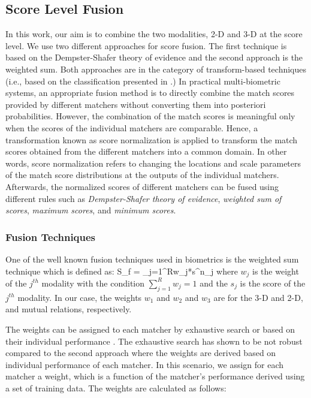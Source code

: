 \subsection{Score Level Fusion}
In this work, our aim is to combine the two modalities, 2-D and 3-D
at the score level. We use two different approaches for score
fusion. The first technique is based on the Dempster-Shafer theory
of evidence and the second approach is the weighted sum. Both
approaches are in the category of transform-based techniques (i.e.,
based on the classification presented in \cite{Ross06}.) In
practical multi-biometric systems, an appropriate fusion method is
to directly combine the match scores provided by different matchers
without converting them into posteriori probabilities. However, the
combination of the match scores is meaningful only when the scores
of the individual matchers are comparable. Hence, a transformation
known as score normalization is applied to transform the match
scores obtained from the different matchers into a common domain. In
other words, score normalization refers to changing the locations
and scale parameters of the match score distributions at the outputs
of the individual matchers. Afterwards, the normalized scores of
different matchers can be fused using different rules such as
\textit{Dempster-Shafer theory of evidence}, \textit{weighted sum of
scores}, \textit{maximum scores}, and \textit{minimum scores}.

\subsubsection{Fusion Techniques}
\label{fusion_techniques} One of the well known fusion techniques
used in biometrics is the weighted sum technique which is defined
as: \beq \displaystyle S_f = \sum_{j=1}^{R}w_j*s^n_j
\label{eq_fusion}\eeq where $w_j$ is the weight of the $j^{th}$
modality with the condition $\sum_{j=1}^{R}w_j=1$ and the $s_j$ is
the score of the $j^{th}$ modality. In our case, the weights $w_1$
and $w_2$ and $w_3$ are for the 3-D and 2-D, and mutual relations,
respectively.

The weights can be assigned to each matcher by exhaustive search or
based on their individual performance \cite{Ross06}. The exhaustive
search has shown to be not robust compared to the second approach
where the weights are derived based on individual performance of
each matcher. In this scenario, we assign for each matcher a weight,
which is a function of the matcher's performance derived using a set
of training data. The weights are calculated as follows:

